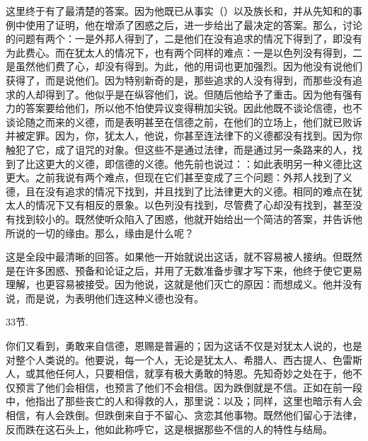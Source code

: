 这里终于有了最清楚的答案。因为他既已从事实（）以及族长和，并从先知和的事例中使用了证明，他在增添了困惑之后，进一步给出了最决定的答案。那么，讨论的问题有两个：一是外邦人得到了，二是他们在没有追求的情况下得到了，即没有为此费心。而在犹太人的情况下，也有两个同样的难点：一是以色列没有得到，二是虽然他们费了心，却没有得到。为此，他的用词也更加强烈。因为他没有说他们获得了，而是说他们。因为特别新奇的是，那些追求的人没有得到，而那些没有追求的人却得到了。他似乎是在纵容他们，说。但随后他给予了重击。因为他有强有力的答案要给他们，所以他不怕使异议变得稍加尖锐。因此他既不谈论信德，也不谈论随之而来的义德，而是表明甚至在信德之前，在他们的立场上，他们就已败诉并被定罪。因为，你，犹太人，他说，你甚至连法律下的义德都没有找到。因为你触犯了它，成了诅咒的对象。但这些不是通过法律，而是通过另一条路来的人，找到了比这更大的义德，即信德的义德。他先前也说过：：如此表明另一种义德比这更大。之前我说有两个难点，但现在它们甚至变成了三个问题：外邦人找到了义德，且在没有追求的情况下找到，并且找到了比法律更大的义德。相同的难点在犹太人的情况下又有相反的景象。以色列没有找到，尽管费了心却没有找到，甚至没有找到较小的。既然使听众陷入了困惑，他就开始给出一个简洁的答案，并告诉他所说的一切的缘由。那么，缘由是什么呢？\par

\par

这是全段中最清晰的回答。如果他一开始就说出这话，就不容易被人接纳。但既然是在许多困惑、预备和论证之后，并用了无数准备步骤才写下来，他终于使它更易理解，也更容易被接受。因为他说，这就是他们灭亡的原因：而想成义。他并没有说，而是说，为表明他们连这种义德也没有。\par

\par

33节. \par

你们又看到，勇敢来自信德，恩赐是普遍的；因为这话不仅是对犹太人说的，也是对整个人类说的。他要说，每一个人，无论是犹太人、希腊人、西古提人、色雷斯人，或其他任何人，只要相信，就享有极大勇敢的特恩。先知奇妙之处在于，他不仅预言了他们会相信，也预言了他们不会相信。因为跌倒就是不信。正如在前一段中，他指出了那些丧亡的人和得救的人，那里说：以及；同样，这里也暗示有人会相信，有人会跌倒。但跌倒来自于不留心、贪恋其他事物。既然他们留心于法律，反而跌在这石头上，他如此称呼它，这是根据那些不信的人的特性与结局。\par

